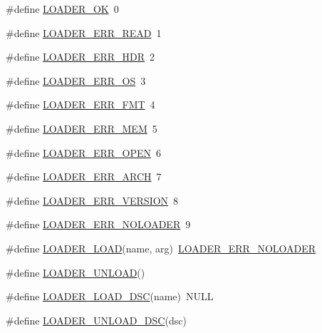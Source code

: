 \begin{DoxyCompactItemize}
\item 
\#define \hyperlink{group__loader_gada90181a874ad4b37fe5283ec10b5c90}{L\-O\-A\-D\-E\-R\-\_\-\-O\-K}~0
\item 
\#define \hyperlink{group__loader_gad5a4f283b71698888678614760e7dd5c}{L\-O\-A\-D\-E\-R\-\_\-\-E\-R\-R\-\_\-\-R\-E\-A\-D}~1
\item 
\#define \hyperlink{group__loader_ga66119a904ce6df0db0fe380777f34c4f}{L\-O\-A\-D\-E\-R\-\_\-\-E\-R\-R\-\_\-\-H\-D\-R}~2
\item 
\#define \hyperlink{group__loader_ga9bb8f88bc9020a446acf2077ed2ebb4d}{L\-O\-A\-D\-E\-R\-\_\-\-E\-R\-R\-\_\-\-O\-S}~3
\item 
\#define \hyperlink{group__loader_ga788ed46b967186e58090a57d492a0299}{L\-O\-A\-D\-E\-R\-\_\-\-E\-R\-R\-\_\-\-F\-M\-T}~4
\item 
\#define \hyperlink{group__loader_gac07de34f89df76808d17eb77658f9474}{L\-O\-A\-D\-E\-R\-\_\-\-E\-R\-R\-\_\-\-M\-E\-M}~5
\item 
\#define \hyperlink{group__loader_ga32cb97b8b6ee978b8e7c7ee60fc80e3a}{L\-O\-A\-D\-E\-R\-\_\-\-E\-R\-R\-\_\-\-O\-P\-E\-N}~6
\item 
\#define \hyperlink{group__loader_gadf7cc6b3021aa0bd92473fc7158e4dfc}{L\-O\-A\-D\-E\-R\-\_\-\-E\-R\-R\-\_\-\-A\-R\-C\-H}~7
\item 
\#define \hyperlink{group__loader_gafce664c06397d97605532c0b47b0a6a1}{L\-O\-A\-D\-E\-R\-\_\-\-E\-R\-R\-\_\-\-V\-E\-R\-S\-I\-O\-N}~8
\item 
\#define \hyperlink{group__loader_ga07f9d3f314685be3e12c4877ee3aac1c}{L\-O\-A\-D\-E\-R\-\_\-\-E\-R\-R\-\_\-\-N\-O\-L\-O\-A\-D\-E\-R}~9
\item 
\#define \hyperlink{group__loader_ga5aacf975957270e22195f6ae35bc5628}{L\-O\-A\-D\-E\-R\-\_\-\-L\-O\-A\-D}(name, arg)~\hyperlink{group__loader_ga07f9d3f314685be3e12c4877ee3aac1c}{L\-O\-A\-D\-E\-R\-\_\-\-E\-R\-R\-\_\-\-N\-O\-L\-O\-A\-D\-E\-R}
\item 
\#define \hyperlink{group__loader_gaea5b57e2eba5e46d289f12988c1942e0}{L\-O\-A\-D\-E\-R\-\_\-\-U\-N\-L\-O\-A\-D}()
\item 
\#define \hyperlink{group__loader_ga77a2b6658478bdb5aa836554dfe54c32}{L\-O\-A\-D\-E\-R\-\_\-\-L\-O\-A\-D\-\_\-\-D\-S\-C}(name)~N\-U\-L\-L
\item 
\#define \hyperlink{group__loader_gaa905120b0fdf2ad0932f679175ffbf9f}{L\-O\-A\-D\-E\-R\-\_\-\-U\-N\-L\-O\-A\-D\-\_\-\-D\-S\-C}(dsc)
\end{DoxyCompactItemize}


